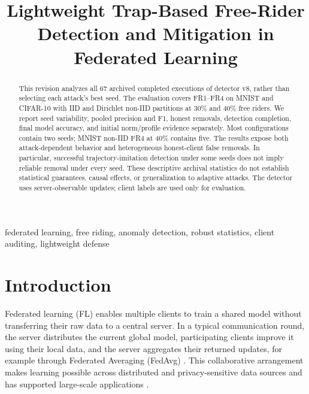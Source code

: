 \documentclass[conference]{IEEEtran}
\title{Lightweight Trap-Based Free-Rider Detection and Mitigation in Federated Learning}
\author{\IEEEauthorblockN{Aashnan Rahman}
\IEEEauthorblockA{Department of Computer Science and Engineering\\
Islamic University of Technology\\
MSc Thesis}}
\begin{document}
\maketitle
{}

\begin{abstract}
This revision analyzes all 67 archived completed executions of detector v8, rather than selecting each attack's best seed. The evaluation covers FR1--FR4 on MNIST and CIFAR-10 with IID and Dirichlet non-IID partitions at 30\% and 40\% free riders. We report seed variability, pooled precision and F1, honest removals, detection completion, final model accuracy, and initial norm/profile evidence separately. Most configurations contain two seeds; MNIST non-IID FR4 at 40\% contains five. The results expose both attack-dependent behavior and heterogeneous honest-client false removals. In particular, successful trajectory-imitation detection under some seeds does not imply reliable removal under every seed. These descriptive archival statistics do not establish statistical guarantees, causal effects, or generalization to adaptive attacks. The detector uses server-observable updates; client labels are used only for evaluation.
\end{abstract}

\begin{IEEEkeywords}
federated learning, free riding, anomaly detection, robust statistics, client auditing, lightweight defense
\end{IEEEkeywords}

\section{Introduction}
Federated learning (FL) enables multiple clients to train a shared model without transferring their raw data to a central server. In a typical communication round, the server distributes the current global model, participating clients improve it using their local data, and the server aggregates their returned updates, for example through Federated Averaging (FedAvg) \cite{mcmahan2017communication}. This collaborative arrangement makes learning possible across distributed and privacy-sensitive data sources and has supported large-scale applications \cite{bonawitz2019towards,hard2018federated}.
\end{document}
